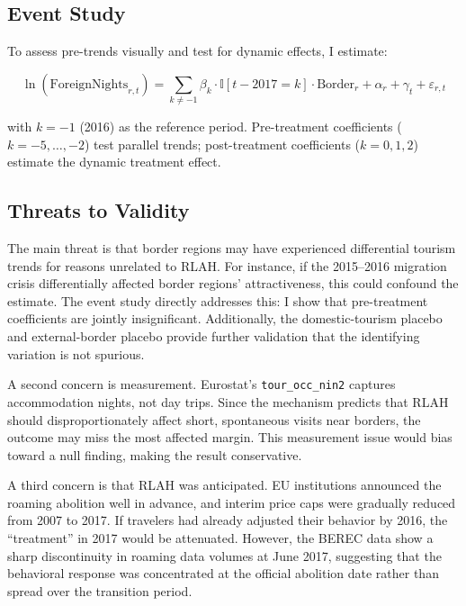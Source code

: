 \documentclass[12pt]{article}
\newcommand{\ind}{\mathbb{I}}
\begin{document}
\subsection{Event Study}

To assess pre-trends visually and test for dynamic effects, I estimate:

\begin{equation}
\ln(\text{ForeignNights}_{r,t}) = \sum_{k \neq -1} \beta_k \cdot \ind[t - 2017 = k] \cdot \text{Border}_r + \alpha_r + \gamma_t + \varepsilon_{r,t}
\label{eq:eventstudy}
\end{equation}

\noindent with $k = -1$ (2016) as the reference period. Pre-treatment coefficients ($k = -5, \ldots, -2$) test parallel trends; post-treatment coefficients ($k = 0, 1, 2$) estimate the dynamic treatment effect.


\subsection{Threats to Validity}

The main threat is that border regions may have experienced differential tourism trends for reasons unrelated to RLAH. For instance, if the 2015--2016 migration crisis differentially affected border regions' attractiveness, this could confound the estimate. The event study directly addresses this: I show that pre-treatment coefficients are jointly insignificant. Additionally, the domestic-tourism placebo and external-border placebo provide further validation that the identifying variation is not spurious.

A second concern is measurement. Eurostat's \texttt{tour\_occ\_nin2} captures accommodation nights, not day trips. Since the mechanism predicts that RLAH should disproportionately affect short, spontaneous visits near borders, the outcome may miss the most affected margin. This measurement issue would bias toward a null finding, making the result conservative.

A third concern is that RLAH was anticipated. EU institutions announced the roaming abolition well in advance, and interim price caps were gradually reduced from 2007 to 2017. If travelers had already adjusted their behavior by 2016, the ``treatment'' in 2017 would be attenuated. However, the BEREC data show a sharp discontinuity in roaming data volumes at June 2017, suggesting that the behavioral response was concentrated at the official abolition date rather than spread over the transition period.
\end{document}
